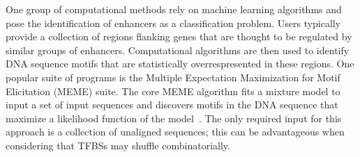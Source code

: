 





        
        One group of computational methods rely on machine learning algorithms and pose the identification of enhancers as a classification problem. Users typically provide a collection of regions flanking genes that are thought to be regulated by similar groups of enhancers. Computational algorithms are then used to identify DNA sequence motifs that are statistically overrespresented in these regions. One popular suite of programs is the Multiple Expectation Maximization for Motif Elicitation (MEME) suite. The core MEME algorithm fits a mixture model to input a set of input sequences and discovers motifs in the DNA sequence that maximize a likelihood function of the model~\cite{bailey1994fitting}. The only required input for this approach is a collection of unaligned sequences; this can be advantageous when considering that TFBSs may shuffle combinatorially. 
        
